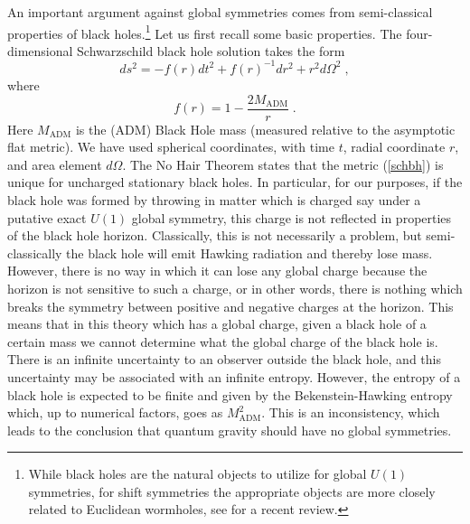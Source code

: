 \documentclass[11pt,a4paper]{article}
\numberwithin{equation}{section}
\numberwithin{table}{section}\setlength{\multlinegap}{25pt}
\newcommand{\be}{\begin{equation}}
\newcommand{\ee}{\end{equation}}
\begin{document}
An important argument against global symmetries comes from semi-classical properties of black holes.\footnote{While black holes are the natural objects to utilize for global $U(1)$ symmetries, for shift symmetries the appropriate objects are more closely related to Euclidean wormholes, see \cite{Hebecker:2018ofv} for a recent review.}  Let us first recall some basic properties. The four-dimensional Schwarzschild black hole solution takes the form
\be
\label{schbh}
ds^2 = -f\left(r\right) dt^2 + f\left(r\right)^{-1}dr^2 + r^2 d\Omega^2\;,
\ee
where
\be
f\left(r\right) = 1- \frac{2 M_{\mathrm{ADM}}}{r} \;.
\ee
Here $M_{\mathrm{ADM}}$ is the (ADM) Black Hole mass (measured relative to the asymptotic flat metric). We have used spherical coordinates, with time $t$, radial coordinate $r$, and area element $d\Omega$. The No Hair Theorem \cite{PhysRev.164.1776} states that the metric (\ref{schbh}) is unique for uncharged stationary black holes. In particular, for our purposes, if the black hole was formed by throwing in matter which is charged say under a putative exact $U(1)$ global symmetry, this charge is not reflected in properties of the black hole horizon. Classically, this is not necessarily a problem, but semi-classically the black hole will emit Hawking radiation and thereby lose mass. However, there is no way in which it can lose any global charge because the horizon is not sensitive to such a charge, or in other words, there is nothing which breaks the symmetry between positive and negative charges at the horizon. This means that in this theory which has a global charge, given a black hole of a certain mass we cannot determine what the global charge of the black hole is. There is an infinite uncertainty to an observer outside the black hole, and this uncertainty may be associated with an infinite entropy. However, the entropy of a black hole is expected to be finite and given by the Bekenstein-Hawking entropy which, up to numerical factors, goes as $M_{\mathrm{ADM}}^2$. This is an inconsistency, which leads to the conclusion that quantum gravity should have no global symmetries. 
\end{document}
